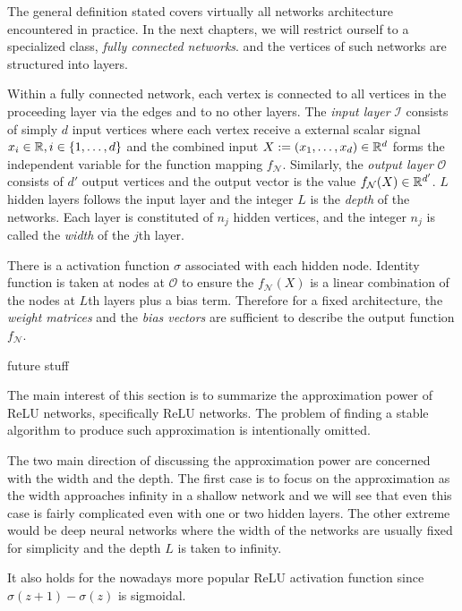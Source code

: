 The general definition stated covers virtually all networks architecture
encountered in practice. In the next chapters, we will restrict ourself to a
specialized class, \textit{fully connected networks}. and the vertices of such
networks are structured into layers.


Within a fully connected network, each vertex is connected to all vertices in
the proceeding layer via the edges and to no other layers. The \textit{input
layer} $\mathcal{I}$ consists of simply $d$ input vertices where each vertex
receive a external scalar signal $x_i \in \mathbb{R}, i \in \{1, \dots, d\}$ and the
combined input $X := (x_1, \dots, x_d) \in \mathbb{R}^d$ forms the independent variable
for the function mapping $f_{\mathcal{N}}$. Similarly, the \textit{output layer}
$\mathcal{O}$ consists of $d'$ output vertices and the output vector is the
value $f_{\mathcal{N}}(X) \in \mathbb{R}^{d'}$. $L$ hidden layers follows the input
layer and the integer $L$ is the \textit{depth} of the networks. Each layer is
constituted of $n_j$ hidden vertices, and the integer $n_j$ is called the
\textit{width} of the $j$th layer. 

There is a activation function $\sigma$ associated with each hidden node.
Identity function is taken at nodes at $\mathcal{O}$ to ensure the
$f_{\mathcal{N}}(   X)$ is a linear combination of the nodes at $L$th layers plus a bias
term. Therefore for a fixed architecture, the \textit{weight matrices} and the
\textit{bias vectors} are sufficient to describe the output function
$f_{\mathcal{N}}$.



future stuff

The main interest of this section is to summarize the approximation power of
ReLU networks, specifically ReLU networks. The problem of finding a stable
algorithm to produce such approximation is intentionally omitted.

The two main direction of discussing the approximation power are concerned with
the width and the depth. The first case is to focus on the approximation as the
width approaches infinity in a shallow network and we will see that even this
case is fairly complicated even with one or two hidden layers. The other extreme
would be deep neural networks where the width of the networks are usually fixed
for simplicity and the depth $L$ is taken to infinity. 



It also holds for the nowadays more popular ReLU activation function since
$\sigma(z+1) - \sigma(z)$ is sigmoidal.

